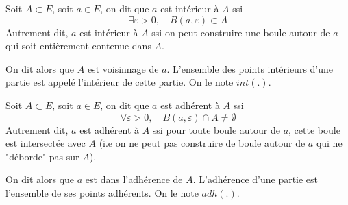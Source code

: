 \begin{definition}[Intérieur]
    Soit $A \subset E$, soit $a \in E$, on dit que $a$ est intérieur à $A$ ssi 
        \[ \boxed { \exists \varepsilon > 0, \quad B(a,\varepsilon) \subset A } \] 
    Autrement dit, $a$ est intérieur à $A$ ssi on peut construire une boule autour de $a$ qui 
    soit entièrement contenue dans $A$. 

    On dit alors que $A$ est voisinnage de $a$. L'ensemble des points intérieurs d'une partie est appelé 
    l'intérieur de cette partie. On le note $int(.)$. 
\end{definition}

\begin{definition}[Adhérence]
    Soit $A \subset E$, soit $a \in E$, on dit que $a$ est adhérent à $A$ ssi 
        \[ \boxed { \forall \varepsilon > 0, \quad B(a,\varepsilon) \cap A \not = \emptyset } \] 
    Autrement dit, $a$ est adhérent à $A$ ssi pour toute boule autour de $a$, cette boule est intersectée avec $A$
    (i.e on ne peut pas construire de boule autour de $a$ qui ne "déborde" pas sur $A$).

    On dit alors que $a$ est dans l'adhérence de $A$. L'adhérence d'une partie est l'ensemble de ses points adhérents. 
    On le note $adh(.)$.
\end{definition}

